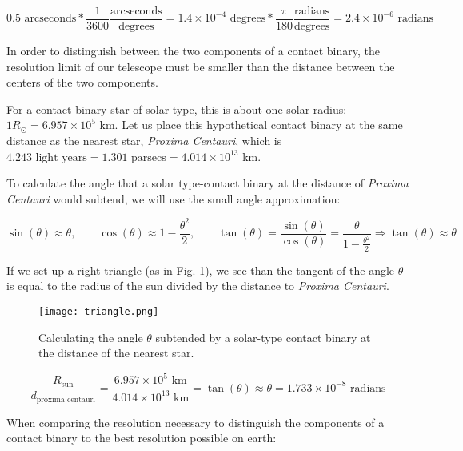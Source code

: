 \documentclass[12pt]{article} %
\numberwithin{equation}{section} %
\begin{document}
\begin{equation} \label{eqn: arcseconds}
0.5 \text{ arcseconds} * \frac{1}{3600} \frac{\text{arcseconds}}{\text{degrees}} = 1.4 \times 10^{-4} \text{ degrees} * \frac{\pi}{180} \frac{\text{radians}}{\text{degrees}} = 2.4 \times 10^{-6} \text{ radians}
\end{equation}

In order to distinguish between the two components of a contact binary, the resolution limit of our telescope must be smaller than the distance between the centers of the two components. 

For a contact binary star of solar type, this is about one solar radius: $1 R_{\odot} = 6.957 \times 10^{5} \text{ km}$. Let us place this hypothetical contact binary at the same distance as the nearest star, \emph{Proxima Centauri}, which is $4.243 \text{ light years} = 1.301 \text{ parsecs} = 4.014 \times 10^{13} \text{ km}$.

To calculate the angle that a solar type-contact binary at the distance of \emph{Proxima Centauri} would subtend, we will use the small angle approximation:

\begin{equation} \label{eqn: smallangle}
\sin(\theta) \approx \theta, \qquad \cos(\theta) \approx 1 - \frac{\theta^{2}}{2}, \qquad \tan(\theta) = \frac{\sin(\theta)}{\cos(\theta)} = \frac{\theta}{1 - \frac{\theta^{2}}{2}} \Rightarrow \tan(\theta) \approx \theta
\end{equation}

If we set up a right triangle (as in Fig. \ref{fig: triangle}), we see than the tangent of the angle $\theta$ is equal to the radius of the sun divided by the distance to \emph{Proxima Centauri}.

\begin{figure}[H]
\centering
\texttt{[image: triangle.png]}
\caption{Calculating the angle $\theta$ subtended by a solar-type contact binary at the distance of the nearest star.}
\label{fig: triangle}
\end{figure}

\begin{equation} \label{eqn: example_angle}
\frac{R_{\text{sun}}}{d_{\text{proxima centauri}}} = \frac{6.957 \times 10^{5} \text{ km}}{4.014 \times 10^{13} \text{ km}} = \tan(\theta) \approx \theta = 1.733 \times 10^{-8} \text{ radians}
\end{equation}

When comparing the resolution necessary to distinguish the components of a contact binary to the best resolution possible on earth:
\end{document}
